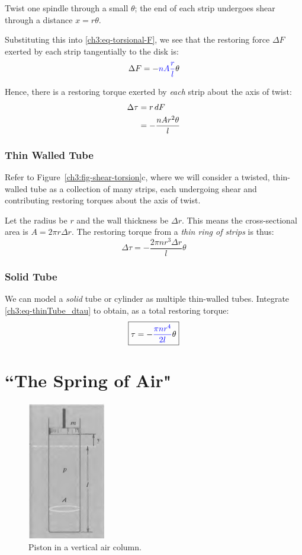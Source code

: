 Twist one spindle through a small $\theta$; the end of each strip undergoes shear through a distance $x=r\theta$. 

Substituting this into \eqref{ch3:eq-torsional-F}, we see that the restoring force $\Delta F$ exerted by each strip tangentially to the disk is:
\[ \Delta F = -\textcolor{blue}{nA\frac{r}{l}} \theta \]

Hence, there is a restoring torque exerted by \emph{each} strip about the axis of twist:
\begin{align*}
	\Delta\tau &= r\,dF  \notag \\
	&= -\frac{nAr^2\theta}{l} 
\end{align*}

\subsubsection{Thin Walled Tube}
Refer to Figure~\ref{ch3:fig-shear-torsion}c, where we will consider a twisted, thin-walled tube as a collection of many strips, each undergoing shear and contributing restoring torques about the axis of twist.

Let the radius be $r$ and the wall thickness be $\Delta r$. This means the cross-sectional area is $A=2\pi r \Delta r$. The restoring torque from a \emph{thin ring of strips} is thus:
\begin{equation}
\Delta \tau = -\frac{2\pi nr^3\Delta r}{l} \theta  \label{ch3:eq-thinTube_dtau}
\end{equation}

\subsubsection{Solid Tube}
We can model a \textit{solid} tube or cylinder as multiple thin-walled tubes. Integrate \eqref{ch3:eq-thinTube_dtau} to obtain, as a total restoring torque:
\begin{equation*}
	\boxed{\tau = -\textcolor{blue}{\frac{\pi nr^4}{2l}} \theta}
\end{equation*}

\section{``The Spring of Air"} \label{ch3:sec-air}

\begin{figure}
	\centering
	\includegraphics[scale=0.7]{phys232/Ch3-air.png} \caption{Piston in a vertical air column.}\label{ch3:fig-air}
\end{figure}

